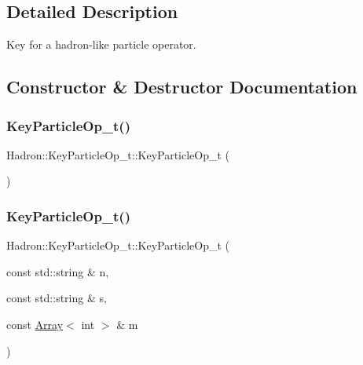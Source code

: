 \subsection{Detailed Description}
Key for a hadron-\/like particle operator. 

\subsection{Constructor \& Destructor Documentation}
\mbox{\label{structHadron_1_1KeyParticleOp__t_aeb83d38886aa274e5e579d1828529809}} 
\subsubsection{\texorpdfstring{KeyParticleOp\_t()}{KeyParticleOp\_t()}\hspace{0.1cm}{\footnotesize\ttfamily [1/9]}}
{\footnotesize\ttfamily Hadron\+::\+Key\+Particle\+Op\+\_\+t\+::\+Key\+Particle\+Op\+\_\+t (\begin{DoxyParamCaption}{ }\end{DoxyParamCaption})\hspace{0.3cm}{\ttfamily [inline]}}

\mbox{\label{structHadron_1_1KeyParticleOp__t_af5270bac6d21394783c83e08224d71b6}} 
\subsubsection{\texorpdfstring{KeyParticleOp\_t()}{KeyParticleOp\_t()}\hspace{0.1cm}{\footnotesize\ttfamily [2/9]}}
{\footnotesize\ttfamily Hadron\+::\+Key\+Particle\+Op\+\_\+t\+::\+Key\+Particle\+Op\+\_\+t (\begin{DoxyParamCaption}\item[{const std\+::string \&}]{n,  }\item[{const std\+::string \&}]{s,  }\item[{const \mbox{\hyperlink{classXMLArray_1_1Array}{Array}}$<$ int $>$ \&}]{m }\end{DoxyParamCaption})\hspace{0.3cm}{\ttfamily [inline]}}

